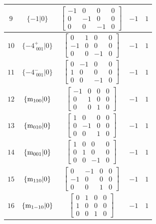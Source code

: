 \documentclass[fleqn,8pt]{jsarticle}
\begin{document}
\begin{longtable}{ccccc}
$ 9 $ & $ \{-1|0\} $ & $ \begin{bmatrix} -1 & 0 & 0 & 0 \\ 0 & -1 & 0 & 0 \\ 0 & 0 & -1 & 0 \end{bmatrix} $ & $ -1 $ & $ 1 $ \\ \hline
$ 10 $ & $ \{-4^{+}_{\,\,001}|0\} $ & $ \begin{bmatrix} 0 & 1 & 0 & 0 \\ -1 & 0 & 0 & 0 \\ 0 & 0 & -1 & 0 \end{bmatrix} $ & $ -1 $ & $ 1 $ \\ \hline
$ 11 $ & $ \{-4^{-}_{\,\,001}|0\} $ & $ \begin{bmatrix} 0 & -1 & 0 & 0 \\ 1 & 0 & 0 & 0 \\ 0 & 0 & -1 & 0 \end{bmatrix} $ & $ -1 $ & $ 1 $ \\ \hline
$ 12 $ & $ \{{\rm m}_{100}|0\} $ & $ \begin{bmatrix} -1 & 0 & 0 & 0 \\ 0 & 1 & 0 & 0 \\ 0 & 0 & 1 & 0 \end{bmatrix} $ & $ -1 $ & $ 1 $ \\ \hline
$ 13 $ & $ \{{\rm m}_{010}|0\} $ & $ \begin{bmatrix} 1 & 0 & 0 & 0 \\ 0 & -1 & 0 & 0 \\ 0 & 0 & 1 & 0 \end{bmatrix} $ & $ -1 $ & $ 1 $ \\ \hline
$ 14 $ & $ \{{\rm m}_{001}|0\} $ & $ \begin{bmatrix} 1 & 0 & 0 & 0 \\ 0 & 1 & 0 & 0 \\ 0 & 0 & -1 & 0 \end{bmatrix} $ & $ -1 $ & $ 1 $ \\ \hline
$ 15 $ & $ \{{\rm m}_{110}|0\} $ & $ \begin{bmatrix} 0 & -1 & 0 & 0 \\ -1 & 0 & 0 & 0 \\ 0 & 0 & 1 & 0 \end{bmatrix} $ & $ -1 $ & $ 1 $ \\ \hline
$ 16 $ & $ \{{\rm m}_{1-10}|0\} $ & $ \begin{bmatrix} 0 & 1 & 0 & 0 \\ 1 & 0 & 0 & 0 \\ 0 & 0 & 1 & 0 \end{bmatrix} $ & $ -1 $ & $ 1 $ \\ \hline

\end{longtable}
\end{document}
